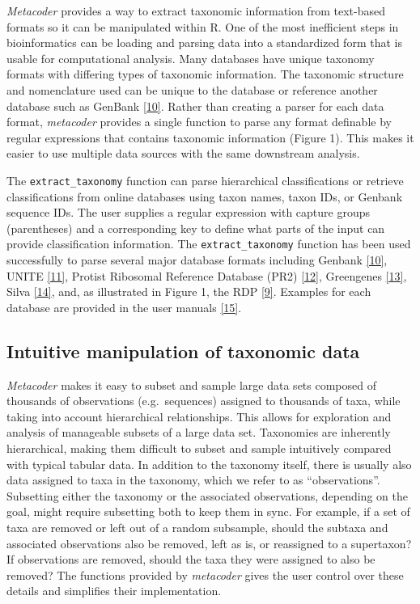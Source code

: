 \documentclass[10pt,letterpaper]{article}
\begin{document}
\emph{Metacoder} provides a way to extract taxonomic information from
text-based formats so it can be manipulated within R. One of the most
inefficient steps in bioinformatics can be loading and parsing data into
a standardized form that is usable for computational analysis. Many
databases have unique taxonomy formats with differing types of taxonomic
information. The taxonomic structure and nomenclature used can be unique
to the database or reference another database such as GenBank
\hyperref[csl:10]{[10]}. Rather than creating a parser for each data
format, \emph{metacoder} provides a single function to parse any format
definable by regular expressions that contains taxonomic information
(Figure 1). This makes it easier to use multiple data sources with the
same downstream analysis.

The \texttt{extract\_taxonomy} function can parse hierarchical
classifications or retrieve classifications from online databases using
taxon names, taxon IDs, or Genbank sequence IDs. The user supplies a
regular expression with capture groups (parentheses) and a corresponding
key to define what parts of the input can provide classification
information. The \texttt{extract\_taxonomy} function has been used
successfully to parse several major database formats including Genbank
\hyperref[csl:10]{[10]}, UNITE \hyperref[csl:11]{[11]}, Protist
Ribosomal Reference Database (PR2) \hyperref[csl:12]{[12]}, Greengenes
\hyperref[csl:13]{[13]}, Silva \hyperref[csl:14]{[14]}, and, as
illustrated in Figure 1, the RDP \hyperref[csl:9]{[9]}. Examples
for each database are provided in the user manuals
\hyperref[csl:15]{[15]}.


\subsection*{Intuitive manipulation of taxonomic
data}\label{intuitive-manipulation-of-taxonomic-data}

\emph{Metacoder} makes it easy to subset and sample large data sets
composed of thousands of observations (e.g.~sequences) assigned to
thousands of taxa, while taking into account hierarchical relationships.
This allows for exploration and analysis of manageable subsets of a
large data set. Taxonomies are inherently hierarchical, making them
difficult to subset and sample intuitively compared with typical tabular
data. In addition to the taxonomy itself, there is usually also data
assigned to taxa in the taxonomy, which we refer to as ``observations''.
Subsetting either the taxonomy or the associated observations, depending
on the goal, might require subsetting both to keep them in sync. For
example, if a set of taxa are removed or left out of a random subsample,
should the subtaxa and associated observations also be removed, left as
is, or reassigned to a supertaxon? If observations are removed, should
the taxa they were assigned to also be removed? The functions provided
by \emph{metacoder} gives the user control over these details and
simplifies their implementation.
\end{document}
